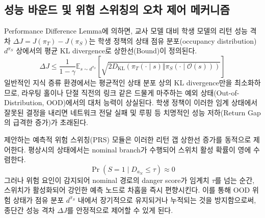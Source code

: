\subsection{성능 바운드 및 위험 스위칭의 오차 제어 메커니즘}
Performance Difference Lemma에 의하면, 교사 모델 대비 학생 모델의 리턴 성능 격차 $\Delta J = J(\pi_T) - J(\pi_S)$는 학생 정책의 상태 점유 분포(occupancy distribution) $d^{\pi_S}$ 상에서의 평균 KL divergence로 상한선(Bound)이 정의된다.
\begin{equation}
    \Delta J \le \frac{1}{1-\gamma} \mathbb{E}_{s \sim d^{\pi_S}} \left[ \sqrt{2 D_{\mathrm{KL}}(\pi_T(\cdot \mid s) \Vert \pi_S(\cdot \mid \mathcal{O}(s)))} \right]
\end{equation}
일반적인 지식 증류 환경에서는 평균적인 상태 분포 상의 KL divergence만을 최소화하므로, 라우팅 홀이나 단절 직전의 링크 같은 드물게 마주하는 예외 상태(Out-of-Distribution, OOD)에서의 대처 능력이 상실된다. 학생 정책이 이러한 임계 상태에서 잘못된 결정을 내리면 네트워크 전달 실패 및 루핑 등 치명적인 성능 저하(Return Gap의 급격한 증가)가 초래된다.

제안하는 예측적 위험 스위칭(PRS) 모듈은 이러한 리턴 갭 상한선 증가를 동적으로 제어한다. 평상시의 상태에서는 nominal branch가 수행되어 스위치 활성 확률이 영에 수렴한다.
\begin{equation}
    \Pr(S=1 \mid D_{a_N} \le \tau) \approx 0
\end{equation}
그러나 위험 요인이 감지되어 nominal 경로의 danger score가 임계치 $\tau$를 넘는 순간, 스위치가 활성화되어 강인한 예측 노드로 차홉을 즉시 편향시킨다. 이를 통해 OOD 위험 상태가 점유 분포 $d^{\pi_S}$ 내에서 장기적으로 유지되거나 누적되는 것을 방지함으로써, 종단간 성능 격차 $\Delta J$를 안정적으로 제어할 수 있게 된다.
